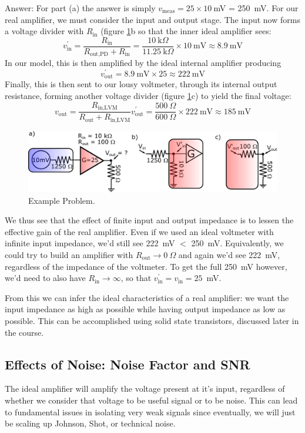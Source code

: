 \documentclass{tufte-book}
\begin{document}
\noindent Answer: For part (a) the answer is simply $v_\text{meas} = 25\times10~$mV = 250~mV. For our real amplifier, we must consider the input and output stage. The input now forms a voltage divider with $R_\text{in}$ (figure \ref{fig:prob_amp}b so that the inner ideal amplifier sees:
$$
v_\text{in}^\prime=\frac{R_\text{in}}{R_\text{out,PD} + R_\text{in}} = \frac{10~\text{k}\Omega}{11.25~\text{k}\Omega}\times10~\text{mV} \approx 8.9~\text{mV}
$$
In our model, this is then amplified by the ideal internal amplifier producing
$$
v_\text{out}^\prime = 8.9~\text{mV}\times 25 \approx 222~\text{mV}
$$
Finally, this is then sent to our lousy voltmeter, through its internal output resistance, forming another voltage divider (figure \ref{fig:prob_amp}c) to yield the final voltage:
$$
v_\text{out} = \frac{R_\text{in,LVM}}{R_\text{out} + R_\text{in,LVM}}v_\text{out}^\prime = \frac{500~\Omega}{600~\Omega}\times 222~\text{mV}\approx 185~\text{mV}
$$

\begin{figure}[ht]
\caption{Example Problem.}
\label{fig:prob_amp}
\begin{center}
\includegraphics[width=\textwidth]{Images/amp_example.pdf}
\end{center}
\end{figure}

We thus see that the effect of finite input and output impedance is to lessen the effective gain of the real amplifier. Even if we used an ideal voltmeter with infinite input impedance, we'd still see 222~mV $<$ 250~mV. Equivalently, we could try to build an amplifier with $R_\text{out} \rightarrow 0~\Omega$ and again we'd see 222~mV, regardless of the impedance of the voltmeter. To get the full 250~mV however, we'd need to also have $R_\text{in} \rightarrow \infty$, so that $v_\text{in}^\prime = v_\text{in} = 25$~mV. 

From this we can infer the ideal characteristics of a real amplifier: we want the input impedance as high as possible while having output impedance as low as possible. This can be accomplished using solid state transistors, discussed later in the course. 

\subsection{Effects of Noise: Noise Factor and SNR}
The ideal amplifier will amplify the voltage present at it's input, regardless of whether we consider that voltage to be useful signal or to be noise. This can lead to fundamental issues in isolating very weak signals since eventually, we will just be scaling up Johnson, Shot, or technical noise. 
\end{document}
